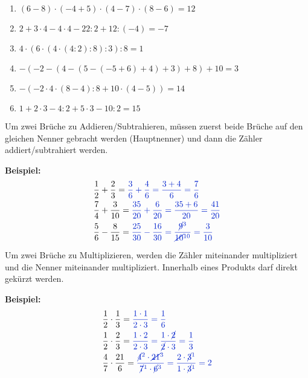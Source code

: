 \begin{Answer}[ref=einfachesRechnenA1]
\begin{minipage}{\textwidth}
\begin{minipage}{0.54\textwidth}
\begin{enumerate}[label=\alph*)]
				\item \((6-8)\cdot(-4+5)\cdot(4-7)\cdot(8-6)=12\)
				\item \(2+3\cdot 4-4\cdot 4-22:2+12:(-4)=-7\)
				\item \(4\cdot(6\cdot(4\cdot(4:2):8):3):8=1\)
				\item \(-(-2-(4-(5-(-5+6)+4)+3)+8)+10=3\)
				\item \(-(-2\cdot 4\cdot (8-4):8+10\cdot (4-5))=14\)
				\item \(1+2\cdot 3-4:2+5\cdot 3-10:2=15\)
			\end{enumerate}
		\end{minipage}%
	\end{minipage}%
\end{Answer}
\newpage
\begin{tcolorbox}
	Um zwei Brüche zu Addieren/Subtrahieren, müssen zuerst beide Brüche auf den gleichen Nenner gebracht werden (Hauptnenner) und dann die Zähler addiert/subtrahiert werden.
\end{tcolorbox}

\textbf{Beispiel:}
\begin{align*}
	&\frac{1}{2}+\frac{2}{3}=\textcolor{loes}{\frac{3}{6}+\frac{4}{6}=\frac{3+4}{6}=\frac{7}{6}}\\
	&\frac{7}{4}+\frac{3}{10}=\textcolor{loes}{\frac{35}{20}+\frac{6}{20}=\frac{35+6}{20}=\frac{41}{20}}\\
	&\frac{5}{6}-\frac{8}{15}=\textcolor{loes}{\frac{25}{30}-\frac{16}{30}=\frac{\cancel{9}^3}{\cancel{10}^{10}}=\frac{3}{10}}
\end{align*}


\begin{tcolorbox}
	Um zwei Brüche zu Multiplizieren, werden die Zähler miteinander multipliziert und die Nenner miteinander multipliziert. Innerhalb eines Produkts darf direkt gekürzt werden.
\end{tcolorbox}

\textbf{Beispiel:}
\begin{align*}
	&\frac{1}{2}\cdot\frac{1}{3}=\textcolor{loes}{\frac{1\cdot 1}{2\cdot 3}=\frac{1}{6}}\\
	&\frac{1}{2}\cdot\frac{2}{3}=\textcolor{loes}{\frac{1\cdot 2}{2\cdot 3}=\frac{1\cdot \cancel{2}}{\cancel{2}\cdot 3}=\frac{1}{3}}\\
	&\frac{4}{7}\cdot\frac{21}{6}=\textcolor{loes}{\frac{\cancel{4}^2\cdot \cancel{21}^3}{\cancel{7}^1\cdot \cancel{6}^3}=\frac{2\cdot\cancel{3}^1}{1\cdot\cancel{3}^1}=2}
\end{align*}


